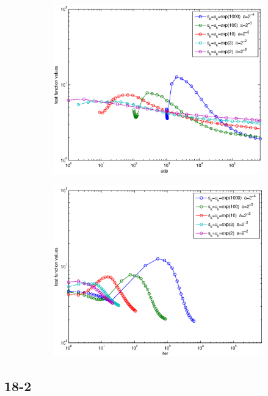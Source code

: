 \documentclass[12pt]{article}
\begin{document}
	\begin{figure}[H]
	\begin{subfigure}[b]{.5\linewidth}
		        \includegraphics[width=4in]{GenFigures/18-1-1.eps}
	\end{subfigure}%
	\begin{subfigure}[b]{.5\linewidth}
		        \includegraphics[width=4in]{GenFigures/18-1-2.eps}
	\end{subfigure}%

	\end{figure}
	
	\subsection{18-2}
\end{document}
